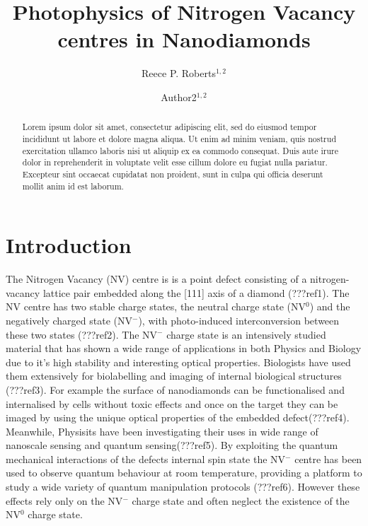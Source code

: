 \documentclass[preprint,prl]{revtex4}
\begin{document}
\title{Photophysics of Nitrogen Vacancy centres in Nanodiamonds}
  
\author{Reece P. Roberts$^{1,2}$}
\author{Author2$^{1,2}$}



\begin{abstract}
Lorem ipsum dolor sit amet, consectetur adipiscing elit, sed do eiusmod tempor incididunt ut labore et dolore magna aliqua. Ut enim ad minim veniam, quis nostrud exercitation ullamco laboris nisi ut aliquip ex ea commodo consequat. Duis aute irure dolor in reprehenderit in voluptate velit esse cillum dolore eu fugiat nulla pariatur. Excepteur sint occaecat cupidatat non proident, sunt in culpa qui officia deserunt mollit anim id est laborum.
\end{abstract}

\maketitle

\section{Introduction}
The Nitrogen Vacancy (NV) centre is is a point defect consisting of a nitrogen-vacancy lattice pair embedded along the [111] axis of a diamond (???ref1). The NV centre has two stable charge states, the neutral charge state (NV$^0$) and the negatively charged state (NV$^-$), with photo-induced interconversion between these two states (???ref2). The NV$^-$ charge state is an intensively studied material that has shown a wide range of applications in both Physics and Biology due to it's high stability and interesting optical properties. Biologists have used them extensively for biolabelling and imaging of internal biological structures (???ref3). For example the surface of nanodiamonds can be functionalised and internalised by cells without toxic effects and once on the target they can be imaged by using the unique optical properties of the embedded defect(???ref4). Meanwhile, Physisits have been investigating their uses in wide range of nanoscale sensing and quantum sensing(???ref5). By exploiting the quantum mechanical interactions of the defects internal spin state the NV$^-$ centre has been used to observe quantum behaviour at room temperature, providing a platform to study a wide variety of quantum manipulation protocols (???ref6). However these effects rely only on the NV$^-$ charge state and often neglect the  existence of the NV$^0$ charge state. 
\end{document}

